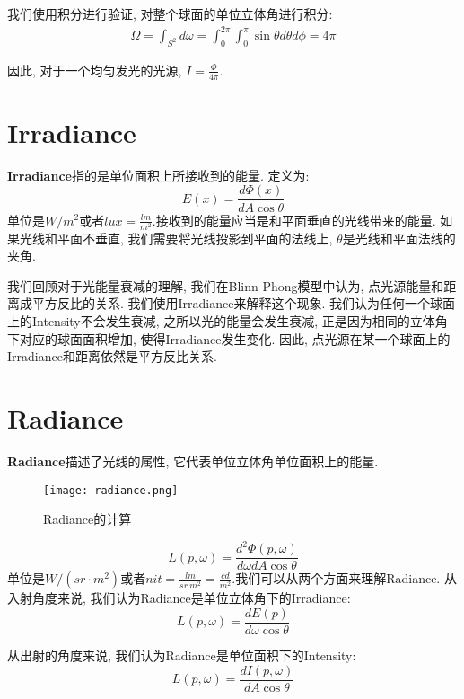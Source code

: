 我们使用积分进行验证, 对整个球面的单位立体角进行积分: 
\begin{equation}
	\begin{split}
		\Omega=\int_{S^2}d\omega=\int_{0}^{2\pi}\int_{0}^{\pi}\sin\theta d\theta d\phi = 4\pi
	\end{split}
\end{equation}

因此, 对于一个均匀发光的光源, $I=\frac{\Phi}{4\pi}$. 

\section{Irradiance}

\textbf{Irradiance}指的是单位面积上所接收到的能量. 定义为: 
\begin{equation}
	E(x)=\frac{d\Phi(x)}{dA\cos\theta}
\end{equation} 单位是$W/m^2$或者$lux=\frac{lm}{m^2}$.接收到的能量应当是和平面垂直的光线带来的能量. 如果光线和平面不垂直, 我们需要将光线投影到平面的法线上, $\theta$是光线和平面法线的夹角. 

我们回顾对于光能量衰减的理解, 我们在Blinn-Phong模型中认为, 点光源能量和距离成平方反比的关系. 我们使用Irradiance来解释这个现象. 我们认为任何一个球面上的Intensity不会发生衰减, 之所以光的能量会发生衰减, 正是因为相同的立体角下对应的球面面积增加, 使得Irradiance发生变化. 因此, 点光源在某一个球面上的Irradiance和距离依然是平方反比关系. 

\section{Radiance}
\textbf{Radiance}描述了光线的属性, 它代表单位立体角单位面积上的能量. 
\begin{figure}[H]
	\centering
	\texttt{[image: radiance.png]}
	\caption{Radiance的计算}
	\label{fig:radiance}
\end{figure}

\begin{equation}
	L(p,\omega)=\frac{d^2\Phi(p,\omega)}{d\omega dA\cos\theta}
\end{equation} 单位是$W/(sr\cdot m^2)$或者$nit=\frac{lm}{sr\ m^2}=\frac{cd}{m^2}$.我们可以从两个方面来理解Radiance. 从入射角度来说, 我们认为Radiance是单位立体角下的Irradiance: 
\begin{equation}
	L(p,\omega)=\frac{dE(p)}{d\omega \cos\theta}
\end{equation}

从出射的角度来说, 我们认为Radiance是单位面积下的Intensity: 
\begin{equation}
		L(p,\omega)=\frac{dI(p,\omega)}{dA \cos\theta}
\end{equation}

